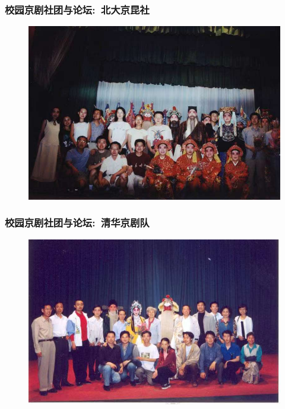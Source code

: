 \documentclass[cjk,slidestop,compress,mathserif,blue]{beamer}
\begin{document}
\frame
{
	\frametitle{校园京剧社团与论坛:~北大京昆社}
\begin{figure}[h!]
\centering
\vspace{-0.3in}
\includegraphics[height=0.70\textwidth,width=1.00\textwidth,clip]{Figures/PekOpe_PKU-3.jpg}
\label{PKU-3}
\end{figure}
}

\frame
{
	\frametitle{校园京剧社团与论坛:~清华京剧队}
\begin{figure}[h!]
\centering
\vspace{-0.3in}
\includegraphics[height=0.70\textwidth,width=1.00\textwidth,clip]{Figures/PekOpe_THU-1.jpg}
\label{THU-1}
\end{figure}
}
\end{document}
